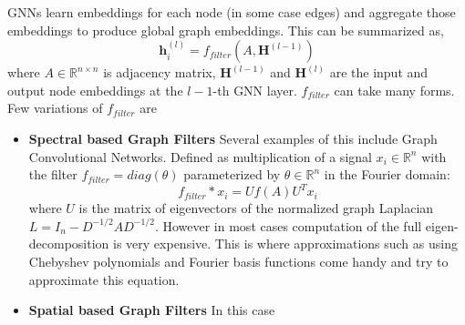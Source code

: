 \documentclass{article}
\begin{document}
GNNs learn embeddings for each node (in some case edges) and aggregate those embeddings to produce global graph embeddings. This can be summarized as, $$\boldsymbol{h}_i^{(l)}=f_{filter}(A, \boldsymbol{H}^{(l - 1)})$$ where $A\in \mathbb R^{n\times n}$ is adjacency matrix, $\boldsymbol{H}^{(l-1)}$ and $\boldsymbol{H}^{(l)}$ are the input and output node embeddings at the $l-1$-th GNN layer. $f_{filter}$ can take many forms. Few variations of $f_{filter}$ are \begin{itemize}
                                                                                                                                                                                                                                                                                                                                                                                                                                                                                   \item \textbf{Spectral based Graph Filters} Several examples of this include Graph Convolutional Networks. Defined as multiplication of a signal $x_i\in\mathbb{R}^n$ with the filter $f_{filter}=diag(\theta)$ parameterized by $\theta\in\mathbb{R}^n$ in the Fourier domain: $$f_{filter}*x_i=Uf(A)U^Tx_i$$ where $U$ is the matrix of eigenvectors of the normalized graph Laplacian $L=I_n-D^{-1/2}AD^{-1/2}$. However in most cases computation of the full eigen-decomposition is very expensive. This is where approximations such as using Chebyshev polynomials and Fourier basis functions come handy and try to approximate this equation.
                                                                                                                                                                                                                                                                                                                                                                                                          \item \textbf{Spatial based Graph Filters} In this case
\end{itemize}




\end{document}
